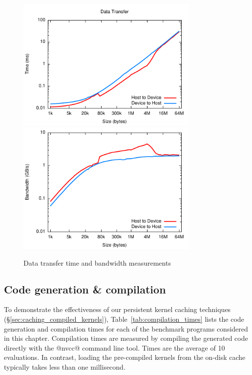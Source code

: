 
\begin{figure}
    \centering
    \includegraphics[width=0.8\textwidth]{images/results/bandwidth/time} \\
    \includegraphics[width=0.8\textwidth]{images/results/bandwidth/bandwidth}
    \caption{Data transfer time and bandwidth measurements}
    \label{fig:data_transfer}
\end{figure}

\subsection{Code generation \& compilation}

To demonstrate the effectiveness of our persistent kernel caching techniques
(\S\ref{sec:caching_compiled_kernels}), Table~\ref{tab:compilation_times} lists
the code generation and compilation times for each of the benchmark programs
considered in this chapter. Compilation times are measured by compiling the
generated code directly with the @nvcc@ command line tool. Times are the average
of 10 evaluations. In contrast, loading the pre-compiled kernels from the
on-disk cache typically takes less than one millisecond.


